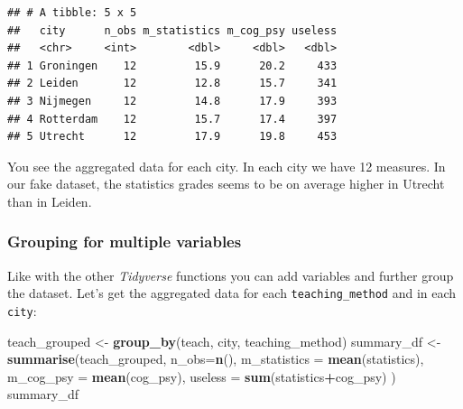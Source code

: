 \documentclass[
]{scrartcl}
\newenvironment{Shaded}{\begin{snugshade}}{\end{snugshade}}
\newcommand{\AttributeTok}[1]{\textcolor[rgb]{0.13,0.29,0.53}{#1}}
\newcommand{\FunctionTok}[1]{\textcolor[rgb]{0.13,0.29,0.53}{\textbf{#1}}}
\newcommand{\NormalTok}[1]{#1}
\newcommand{\OtherTok}[1]{\textcolor[rgb]{0.56,0.35,0.01}{#1}}
\newcommand{\SpecialCharTok}[1]{\textcolor[rgb]{0.81,0.36,0.00}{\textbf{#1}}}
\begin{document}
\begin{verbatim}
## # A tibble: 5 x 5
##   city      n_obs m_statistics m_cog_psy useless
##   <chr>     <int>        <dbl>     <dbl>   <dbl>
## 1 Groningen    12         15.9      20.2     433
## 2 Leiden       12         12.8      15.7     341
## 3 Nijmegen     12         14.8      17.9     393
## 4 Rotterdam    12         15.7      17.4     397
## 5 Utrecht      12         17.9      19.8     453
\end{verbatim}

You see the aggregated data for each city. In each city we have 12 measures. In our fake dataset, the statistics grades seems to be on average higher in Utrecht than in Leiden.

\hypertarget{grouping-for-multiple-variables}{%
\subsubsection*{Grouping for multiple variables}\label{grouping-for-multiple-variables}}

Like with the other \emph{Tidyverse} functions you can add variables and further group the dataset. Let's get the aggregated data for each \texttt{teaching\_method} and in each \texttt{city}:

\begin{Shaded}
\begin{Highlighting}[]
\NormalTok{teach\_grouped }\OtherTok{\textless{}{-}} \FunctionTok{group\_by}\NormalTok{(teach, city, teaching\_method)}
\NormalTok{summary\_df }\OtherTok{\textless{}{-}} \FunctionTok{summarise}\NormalTok{(teach\_grouped,}
                \AttributeTok{n\_obs=}\FunctionTok{n}\NormalTok{(),}
                \AttributeTok{m\_statistics =} \FunctionTok{mean}\NormalTok{(statistics),}
                \AttributeTok{m\_cog\_psy =} \FunctionTok{mean}\NormalTok{(cog\_psy),}
                \AttributeTok{useless =} \FunctionTok{sum}\NormalTok{(statistics}\SpecialCharTok{+}\NormalTok{cog\_psy) )}
\NormalTok{summary\_df}
\end{Highlighting}
\end{Shaded}
\end{document}
